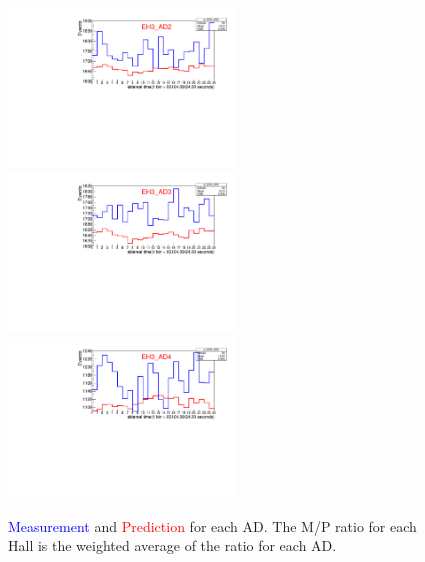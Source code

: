 \documentclass[amsmath, amssymb,
nobibnotes, superscriptaddress]{revtex4-1}
\begin{document}
\begin{figure}[H]
\begin{center}
\includegraphics[width=6cm]{MeasurementPredictionEH3_AD2.pdf}\\
\includegraphics[width=6cm]{MeasurementPredictionEH3_AD3.pdf}
\includegraphics[width=6cm]{MeasurementPredictionEH3_AD4.pdf}
\caption{\textcolor{blue}{Measurement} and \textcolor{red}{Prediction} for each AD. The M/P ratio for each Hall is the weighted average of the ratio for each AD.} 
\end{center} 
\end{figure} 
 
\end{document}
